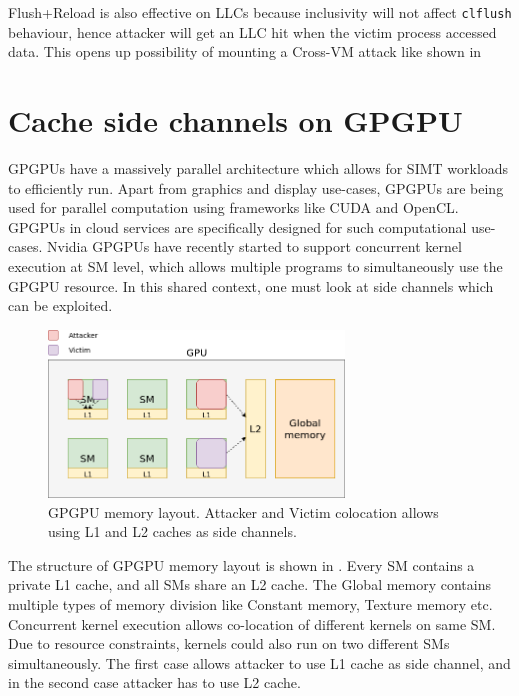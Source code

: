 Flush+Reload is also effective on LLCs because inclusivity will not affect \texttt{clflush} behaviour, hence
attacker will get an LLC hit when the victim process accessed data. This opens up possibility of mounting a Cross-VM
attack  like shown in 

\section{Cache side channels on GPGPU}

GPGPUs have a massively parallel architecture which allows for SIMT workloads to efficiently run.
Apart from graphics and display use-cases, GPGPUs are being used for parallel computation using
frameworks like CUDA and OpenCL. GPGPUs in cloud services are specifically designed for such computational
use-cases. Nvidia GPGPUs have recently started to support concurrent kernel execution at SM level,
which allows multiple programs to simultaneously use the GPGPU resource. In this shared context,
one must look at side channels which can be exploited.

\begin{figure}[h]
\centering
\includegraphics[width=0.7\textwidth]{gpgpu}
\caption[Memory layout of GPGPU]{GPGPU memory layout. Attacker and Victim colocation allows using L1 and L2 caches as side channels.}
\label{fig:gpgpu}
\end{figure}

The structure of GPGPU memory layout is shown in . Every SM contains a private L1 cache,
and all SMs share an L2 cache. The Global memory contains multiple types of memory division like Constant memory,
Texture memory etc. Concurrent kernel execution allows co-location of different kernels on same SM. Due to resource
constraints, kernels could also run on two different SMs simultaneously. The first case allows attacker to
use L1 cache as side channel, and in the second case attacker has to use L2 cache.

